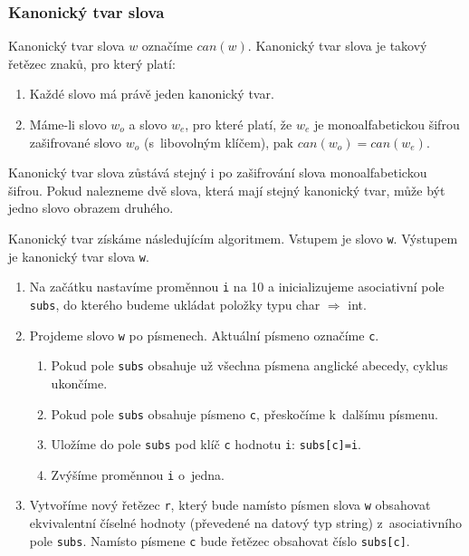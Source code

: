 \documentclass[12pt]{article}
\theoremstyle{definition}
\newcommand{\var}[1]{\texttt{#1}}
\begin{document}



\subsubsection{Kanonický tvar slova}
\label{kanon}
Kanonický tvar slova $w$ označíme $can(w)$. Kanonický tvar slova je takový řetězec znaků, pro který platí: 

\begin{enumerate}
\item Každé slovo má právě jeden kanonický tvar.
\item Máme-li slovo $w_o$ a  slovo $w_e$, pro které platí, že $w_e$ je monoalfabetickou šifrou zašifrované slovo $w_o$ (s~libovolným klíčem), pak $can(w_o)=can(w_e)$.
\end{enumerate}

Kanonický tvar slova zůstává stejný i po zašifrování slova monoalfabetickou šifrou. Pokud nalezneme dvě slova, která mají stejný kanonický tvar, může být jedno slovo obrazem druhého. 

Kanonický tvar získáme následujícím algoritmem. Vstupem je slovo \var{w}. Výstupem je kanonický tvar slova \var{w}.

\begin{enumerate}
\item Na začátku nastavíme proměnnou \var{i} na 10 a inicializujeme asociativní pole \var{subs}, do kterého budeme ukládat položky typu char $\Rightarrow$ int. 
\item Projdeme slovo \var{w} po písmenech. Aktuální písmeno označíme \var{c}.
\begin{enumerate}
\renewcommand{\labelenumii}{\arabic{enumi}. \arabic{enumii}.}
\item Pokud pole \var{subs} obsahuje už všechna písmena anglické abecedy, cyklus ukončíme.
\item Pokud pole \var{subs} obsahuje písmeno \var{c}, přeskočíme k~dalšímu písmenu. 
\item Uložíme do pole \var{subs} pod klíč \var{c} hodnotu \var{i}: \var{subs[c]=i}.
\item Zvýšíme proměnnou \var{i} o~jedna.
\end{enumerate}
\item Vytvoříme nový řetězec \var{r}, který bude namísto písmen slova \var{w} obsahovat ekvivalentní číselné hodnoty (převedené na datový typ string) z~asociativního pole \var{subs}. Namísto písmene \var{c} bude řetězec obsahovat číslo \var{subs[c]}.
\end{enumerate}
\end{document}
